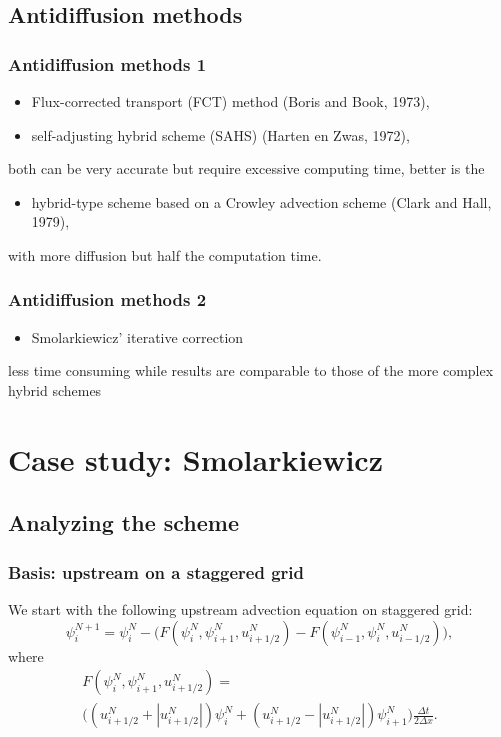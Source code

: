 \documentclass[hyperref={pdfstartview=Fit}]{beamer}
\providecommand{\abs}[1]{\left\lvert#1\right\rvert}
\begin{document}
\subsection{Antidiffusion methods}

\begin{frame}
\frametitle{Antidiffusion methods 1}
\begin{itemize}
\item Flux-corrected transport (FCT) method (Boris and Book, 1973),
\item self-adjusting hybrid scheme (SAHS) (Harten en Zwas, 1972),
\end{itemize}
   both can be very accurate but require excessive computing time, better is the
\begin{itemize}
   \item hybrid-type scheme based on a Crowley advection scheme (Clark and Hall, 1979),
\end{itemize}
   with more diffusion but half the computation time.
\end{frame}

\begin{frame}
\frametitle{Antidiffusion methods 2}
\begin{itemize}
\item Smolarkiewicz' iterative correction
\end{itemize}
   less time consuming while results are comparable to those of the more complex hybrid schemes
\end{frame}

\section{Case study: Smolarkiewicz}
\subsection{Analyzing the scheme}

\begin{frame}
\frametitle{Basis: upstream on a staggered grid}
We start with the following upstream advection equation on staggered grid:
\begin{equation*}
 \psi_i^{N+1} = \psi_i^N - \Big( F \left( \psi_i^N,\psi_{i+1}^N,u_{i+1/2}^N\right)
-F \left( \psi_{i-1}^N,\psi_{i}^N,u_{i-1/2}^N\right) \Big),
\end{equation*}
where
\begin{multline*}
F \left( \psi_i^N,\psi_{i+1}^N,u_{i+1/2}^N\right) =\\
\Big( \left( u_{i+1/2}^N + \abs{u_{i+1/2}^N} \right) \psi_i^N
+ \left( u_{i+1/2}^N - \abs{u_{i+1/2}^N} \right) \psi_{i+1}^N \Big)
\frac{\Delta t}{2 \Delta x}.
\end{multline*}
\end{frame}
\end{document}
